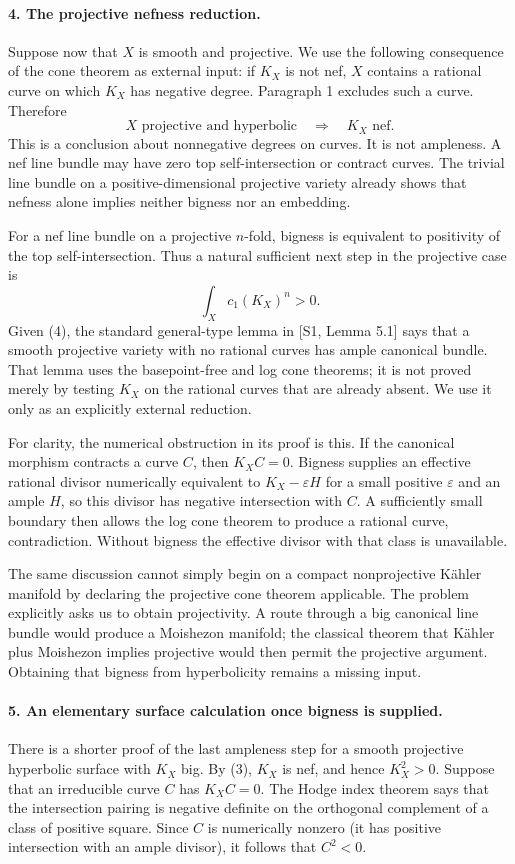 \documentclass[11pt]{article}
\begin{document}
\paragraph{4. The projective nefness reduction.}
Suppose now that $X$ is smooth and projective. We use the following consequence of the cone theorem as external input: if $K_X$ is not nef, $X$ contains a rational curve on which $K_X$ has negative degree. Paragraph 1 excludes such a curve. Therefore
\[
 X\text{ projective and hyperbolic}\quad\Longrightarrow
 \quad K_X\text{ nef}.                                \tag{3}
\]
This is a conclusion about nonnegative degrees on curves. It is not ampleness. A nef line bundle may have zero top self-intersection or contract curves. The trivial line bundle on a positive-dimensional projective variety already shows that nefness alone implies neither bigness nor an embedding.

For a nef line bundle on a projective $n$-fold, bigness is equivalent to positivity of the top self-intersection. Thus a natural sufficient next step in the projective case is
\[
 \int_X c_1(K_X)^n>0.                                  \tag{4}
\]
Given (4), the standard general-type lemma in [S1, Lemma 5.1] says that a smooth projective variety with no rational curves has ample canonical bundle. That lemma uses the basepoint-free and log cone theorems; it is not proved merely by testing $K_X$ on the rational curves that are already absent. We use it only as an explicitly external reduction.

For clarity, the numerical obstruction in its proof is this. If the canonical morphism contracts a curve $C$, then $K_XC=0$. Bigness supplies an effective rational divisor numerically equivalent to $K_X-\varepsilon H$ for a small positive $\varepsilon$ and an ample $H$, so this divisor has negative intersection with $C$. A sufficiently small boundary then allows the log cone theorem to produce a rational curve, contradiction. Without bigness the effective divisor with that class is unavailable.

The same discussion cannot simply begin on a compact nonprojective K\"ahler manifold by declaring the projective cone theorem applicable. The problem explicitly asks us to obtain projectivity. A route through a big canonical line bundle would produce a Moishezon manifold; the classical theorem that K\"ahler plus Moishezon implies projective would then permit the projective argument. Obtaining that bigness from hyperbolicity remains a missing input.

\paragraph{5. An elementary surface calculation once bigness is supplied.}
There is a shorter proof of the last ampleness step for a smooth projective hyperbolic surface with $K_X$ big. By (3), $K_X$ is nef, and hence $K_X^2>0$. Suppose that an irreducible curve $C$ has $K_XC=0$. The Hodge index theorem says that the intersection pairing is negative definite on the orthogonal complement of a class of positive square. Since $C$ is numerically nonzero (it has positive intersection with an ample divisor), it follows that $C^2<0$.
\end{document}

